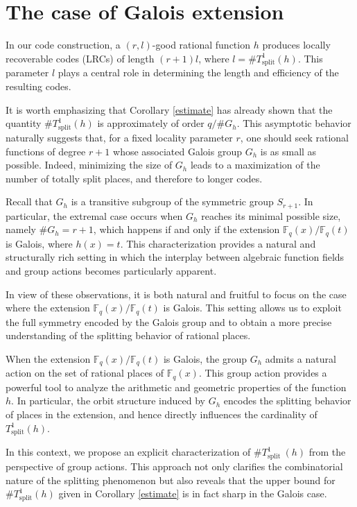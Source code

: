 \documentclass[1p,final]{elsarticle}
\newtheorem{open problem}[theorem]{Open Problem}
\begin{document}
\section{The case of Galois extension}\label{Gal case}

In our code construction, a $(r,l)$-good rational function $h$ produces locally recoverable codes (LRCs) of length $(r+1)l$, where $l=\# T_{\text{split}}^1(h)$. This parameter $l$ plays a central role in determining the length and efficiency of the resulting codes. 

It is worth emphasizing that Corollary \ref{estimate} has already shown that the quantity $\# T_{\text{split}}^1(h)$ is approximately of order $q/\#G_{h}$. This asymptotic behavior naturally suggests that, for a fixed locality parameter $r$, one should seek rational functions of degree $r+1$ whose associated Galois group $G_h$ is as small as possible. Indeed, minimizing the size of $G_h$ leads to a maximization of the number of totally split places, and therefore to longer codes.

Recall that $G_{h}$ is a transitive subgroup of the symmetric group $S_{r+1}$. In particular, the extremal case occurs when $G_{h}$ reaches its minimal possible size, namely $\#G_h = r+1$, which happens if and only if the extension $\mathbb{F}_{q}(x)/ \mathbb{F}_{q}(t)$ is Galois, where $h(x)=t$. This characterization provides a natural and structurally rich setting in which the interplay between algebraic function fields and group actions becomes particularly apparent.

In view of these observations, it is both natural and fruitful to focus on the case where the extension $\mathbb{F}_{q}(x)/\mathbb{F}_{q}(t)$ is Galois. This setting allows us to exploit the full symmetry encoded by the Galois group and to obtain a more precise understanding of the splitting behavior of rational places.

When the extension $\mathbb{F}_{q}(x)/\mathbb{F}_{q}(t)$ is Galois, the group $G_{h}$ admits a natural action on the set of rational places of $\mathbb{F}_{q}(x)$. This group action provides a powerful tool to analyze the arithmetic and geometric properties of the function $h$. In particular, the orbit structure induced by $G_h$ encodes the splitting behavior of places in the extension, and hence directly influences the cardinality of $T_{\text{split}}^1(h)$.

In this context, we propose an explicit characterization of $\# T_{\text {split }}^1(h)$ from the perspective of group actions. This approach not only clarifies the combinatorial nature of the splitting phenomenon but also reveals that the upper bound for $\# T_{\text{split}}^1(h)$ given in Corollary \ref{estimate} is in fact sharp in the Galois case.
\end{document}
